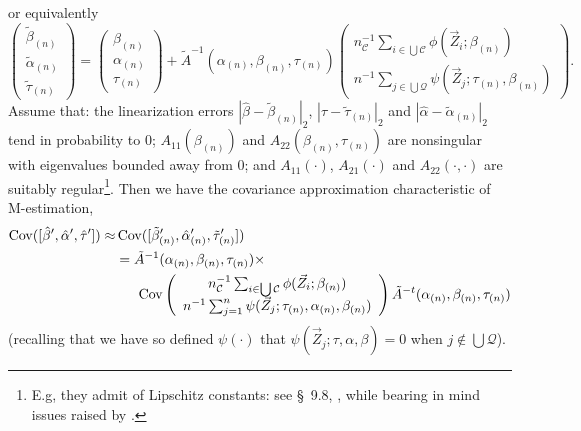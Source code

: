 \documentclass{article}
\begin{document}
or equivalently
\begin{equation*}
\left(\begin{array}{c}\tilde{\beta}_{(n)}\\ \tilde{\alpha}_{(n)}\\ \tilde{\tau}_{(n)} \end{array}\right)
    = \left(\begin{array}{c}\beta_{(n)} \\\alpha_{(n)}\\
                    \tau_{(n)} \end{array}\right)
    + \tilde{A}^{-1}(\alpha_{(n)}, \beta_{(n)}, \tau_{(n)})\left(
    \begin{array}{c}
      n_{\mathcal{C}}^{-1}\sum_{i\in \bigcup
      \mathcal{C}}\phi(\vec{Z}_{i}; \beta_{(n)})\\
      n^{-1}\sum_{j\in \bigcup
                 \mathcal{Q}}\psi(\vec{Z}_{j};
                 \tau_{(n)},\beta_{(n)} )
    \end{array}
\right).
\end{equation*}
Assume that: the linearization errors $|\hat\beta -\tilde{\beta}_{(n)}|_{2}$, 
$|\hat\tau -\tilde{\tau}_{(n)}|_{2}$ and $|\hat\alpha - \tilde{\alpha}_{(n)}|_{2}$ tend in probability to 0;
$A_{11}(\beta_{(n)})$ and $A_{22}(\beta_{(n)}, \tau_{(n)})$ are nonsingular
with eigenvalues bounded away from 0; and $A_{11}(\cdot)$, $A_{21}(\cdot)$ and $A_{22}(\cdot, \cdot)$ are suitably
regular\footnote{E.g, they admit of Lipschitz constants: see \S~9.8,
  , while bearing in mind issues raised
  by .}. 
Then we have the covariance approximation characteristic of M-estimation,
\begin{align*} \operatorname{Cov}([\hat\beta',\hat\alpha', \hat\tau']) \approx&
  \operatorname{Cov}([\tilde{\beta}_{(n)}',\hat{\alpha}_{(n)}',\tilde{\tau}_{(n)}'])\\
  &=
    \tilde{A}^{-1}(\alpha_{(n)}, \beta_{(n)}, \tau_{(n)}) \times \\
  &\hspace{1.5em} \operatorname{Cov}\left(
     \begin{array}{c}
       n_{\mathcal{C}}^{-1}\sum_{i\in \bigcup \mathcal{C}}\phi(\vec{Z}_{i}; \beta_{(n)} )\\
       n^{-1}\sum_{j=1}^{n}\psi(\vec{Z}_{j}; \tau_{(n)}, \alpha_{(n)}, \beta_{(n)} )
     \end{array}
    \right)
  \tilde{A}^{-t}(\alpha_{(n)}, \beta_{(n)}, \tau_{(n)})
\end{align*}
(recalling that we have so defined $\psi(\cdot)$ that $\psi(\vec{Z}_{j}; \tau, \alpha, \beta) = 0$ when
$j\not\in \bigcup \mathcal{Q}$).
\end{document}
